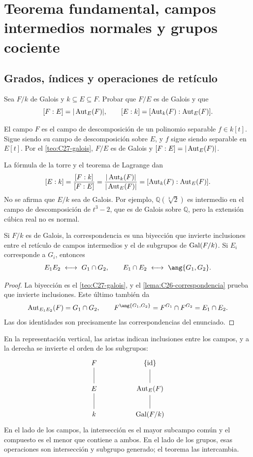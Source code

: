 \section{Teorema fundamental, campos intermedios normales y grupos cociente}\label{sec:campos-galois}

\subsection{Grados, índices y operaciones de retículo}\label{tema:27-2-1}
\begin{ejer}\label{ejer:C27-intermedio}
Sea $F/k$ de Galois y $k\subseteq E\subseteq F$. Probar que $F/E$ es de Galois y que
\[
[F:E]=|\operatorname{Aut}_E(F)|,\qquad
[E:k]=[\operatorname{Aut}_k(F):\operatorname{Aut}_E(F)].
\]
\end{ejer}
\begin{sol}
El campo $F$ es el campo de descomposición de un polinomio separable $f\in k[t]$. Sigue siendo su campo de descomposición sobre $E$, y $f$ sigue siendo separable en $E[t]$. Por el \cref{teo:C27-galois}, $F/E$ es de Galois y $[F:E]=|\operatorname{Aut}_E(F)|$.

La fórmula de la torre y el teorema de Lagrange dan
\[
[E:k]=\frac{[F:k]}{[F:E]}
=\frac{|\operatorname{Aut}_k(F)|}{|\operatorname{Aut}_E(F)|}
=[\operatorname{Aut}_k(F):\operatorname{Aut}_E(F)].
\]
No se afirma que $E/k$ sea de Galois. Por ejemplo, $\mathbb Q(\sqrt[3]{2})$ es intermedio en el campo de descomposición de $t^3-2$, que es de Galois sobre $\mathbb Q$, pero la extensión cúbica real no es normal.
\end{sol}

\begin{teo}\label{teo:C27-reticulos}
Si $F/k$ es de Galois, la correspondencia es una biyección que invierte inclusiones entre el retículo de campos intermedios y el de subgrupos de $\operatorname{Gal}(F/k)$. Si $E_i$ corresponde a $G_i$, entonces
\[
E_1E_2\ \longleftrightarrow\ G_1\cap G_2,
\qquad E_1\cap E_2\ \longleftrightarrow\ \ang{G_1,G_2}.
\]
\end{teo}
\begin{proof}
La biyección es el \cref{teo:C27-galois}, y el \cref{lema:C26-correspondencia} prueba que invierte inclusiones. Este último también da
\[
\Aut_{E_1E_2}(F)=G_1\cap G_2,
\qquad
F^{\ang{G_1,G_2}}=F^{G_1}\cap F^{G_2}=E_1\cap E_2.
\]
Las dos identidades son precisamente las correspondencias del enunciado.
\end{proof}
En la representación vertical, las aristas indican inclusiones entre los campos, y a la derecha se invierte el orden de los subgrupos:
\[
\begin{tikzcd}[column sep=huge,row sep=2em]
F\arrow[d,dash]&\{\id\}\arrow[d,dash]\\
E\arrow[d,dash]&\Aut_E(F)\arrow[d,dash]\\
k&\gal(F/k)
\end{tikzcd}
\]
En el lado de los campos, la intersección es el mayor subcampo común y el compuesto es el menor que contiene a ambos. En el lado de los grupos, esas operaciones son intersección y subgrupo generado; el teorema las intercambia.

